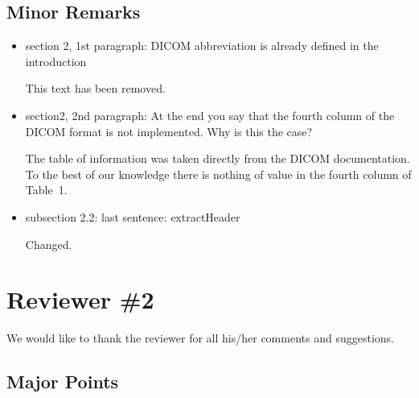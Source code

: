 \documentclass[11pt]{article}
\begin{document}
\subsection*{Minor Remarks}

\begin{itemize} 

\item section 2, 1st paragraph: DICOM abbreviation is already defined
  in the introduction

  This text has been removed.

\item section2, 2nd paragraph: At the end you say that the fourth
  column of the DICOM format is not implemented. Why is this the case?

  The table of information was taken directly from the DICOM
  documentation.  To the best of our knowledge there is nothing of
  value in the fourth column of Table~1.

\item subsection 2.2: last sentence: extractHeader

  Changed.

\end{itemize}

\section*{Reviewer \#2}

We would like to thank the reviewer for all his/her comments and
suggestions.

\subsection*{Major Points}
\end{document}
